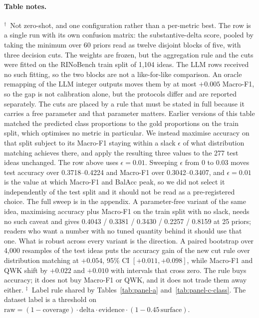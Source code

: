 \paragraph{Table notes.}
$^{\dagger}$~Not zero-shot, and one configuration rather than a per-metric best.
The row is a single run with its own confusion matrix: the substantive-delta
score, pooled by taking the minimum over 60 priors read as twelve disjoint
blocks of five, with three decision cuts. The weights are frozen, but the
aggregation rule and the cuts were fitted on the RINoBench train split of
1{,}104 ideas. The LLM rows received no such fitting, so the two blocks are not
a like-for-like comparison. An oracle remapping of the LLM integer outputs moves
them by at most $+0.005$ Macro-F1, so the gap is not calibration alone, but the
protocols differ and are reported separately.
The cuts are placed by a rule that must be stated in full because it carries a
free parameter and that parameter matters. Earlier versions of this table
matched the predicted class proportions to the gold proportions on the train
split, which optimises no metric in particular. We instead maximise accuracy on
that split subject to its Macro-F1 staying within a slack $\epsilon$ of what
distribution matching achieves there, and apply the resulting three values to
the 277 test ideas unchanged. The row above uses $\epsilon=0.01$. Sweeping
$\epsilon$ from 0 to 0.03 moves test accuracy over 0.3718--0.4224 and Macro-F1
over 0.3042--0.3407, and $\epsilon=0.01$ is the value at which Macro-F1 and
BalAcc peak, so we did not select it independently of the test split and it
should not be read as a pre-registered choice. The full sweep is in the
appendix. A parameter-free variant of the same idea, maximising accuracy plus
Macro-F1 on the train split with no slack, needs no such caveat and gives
0.4043 / 0.3381 / 0.3430 / 0.2257 / 0.8159 at 25 priors; readers who want a
number with no tuned quantity behind it should use that one.
What is robust across every variant is the direction. A paired bootstrap over
4{,}000 resamples of the test ideas puts the accuracy gain of the new cut rule
over distribution matching at $+0.054$, 95\% CI $[+0.011, +0.098]$, while
Macro-F1 and QWK shift by $+0.022$ and $+0.010$ with intervals that cross zero.
The rule buys accuracy; it does not buy Macro-F1 or QWK, and it does not trade
them away either.
$^{\ddagger}$~Label rule shared by Tables~\ref{tab:panel-a} and~\ref{tab:panel-c-class}. The dataset label is a threshold on
$\mathrm{raw}=(1-\text{coverage})\cdot\text{delta}\cdot\text{evidence}\cdot(1-0.45\,\text{surface})$.
